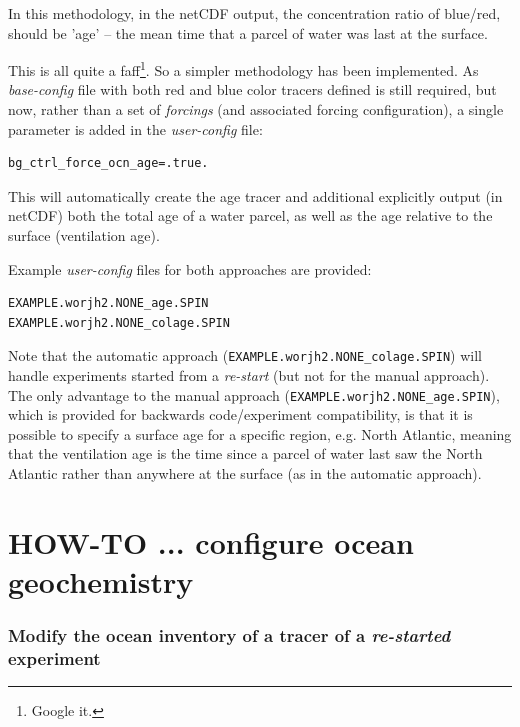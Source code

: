 \documentclass[11pt,fleqn]{book} %
\begin{document}
In this methodology, in the netCDF output, the concentration ratio of blue/red, should be 'age' -- the mean time that a parcel of water was last at the surface.

This is all quite a faff\footnote{Google it.}. So a simpler methodology has been implemented. As \textit{base-config} file with both red and blue color tracers defined is still required, but now, rather than a set of \textit{forcings} (and associated forcing configuration), a single parameter is added in the \textit{user-config} file:
\vspace{-2pt}\begin{verbatim}
bg_ctrl_force_ocn_age=.true.
\end{verbatim}\vspace{-2pt}
This will automatically create the age tracer and additional explicitly output (in netCDF) both the total age of a water parcel, as well as the age relative to the surface (ventilation age).

Example \textit{user-config} files for both approaches are provided: 
\vspace{-2pt}\begin{verbatim}
EXAMPLE.worjh2.NONE_age.SPIN
EXAMPLE.worjh2.NONE_colage.SPIN
\end{verbatim}\vspace{-2pt}

\noindent Note that the automatic approach (\texttt{EXAMPLE.worjh2.NONE\_colage.SPIN}) will handle experiments started from a \textit{re-start} (but not for the manual approach). The only advantage to the manual approach (\texttt{EXAMPLE.worjh2.NONE\_age.SPIN}), which is provided for backwards code/experiment compatibility, is that it is possible to specify a surface age for a specific region, e.g. North Atlantic, meaning that the ventilation age is the time since a parcel of water last saw the North Atlantic rather than anywhere at the surface (as in the automatic approach).


\newpage


\section{HOW-TO ...  configure ocean geochemistry}

%
\subsubsection{Modify the ocean inventory of a tracer of a \textit{re-started} experiment}
\vspace{1mm}
\end{document}

